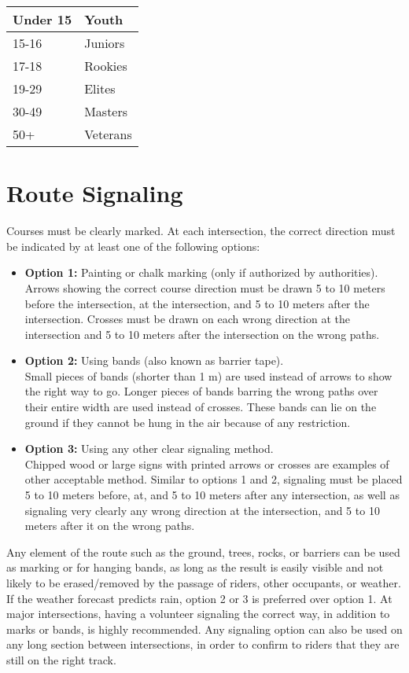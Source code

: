 \begin{tabular}{|l|l|}
\hline
Under 15 & Youth \\
\hline
15-16 & Juniors \\
\hline
17-18 & Rookies \\
\hline
19-29 & Elites \\
\hline
30-49 & Masters \\
\hline
50+ & Veterans \\
\hline
\end{tabular}

\section{Route Signaling}
Courses must be clearly marked.
At each intersection, the correct direction must be indicated by at least one of the following options:
\begin{itemize}
\item \textbf{Option 1:} Painting or chalk marking (only if authorized by authorities).\\
Arrows showing the correct course direction must be drawn 5 to 10 meters before the intersection, at the intersection, and 5 to 10 meters after the intersection.
Crosses must be drawn on each wrong direction at the intersection and 5 to 10 meters after the intersection on the wrong paths.
\item \textbf{Option 2:} Using bands (also known as barrier tape).\\
Small pieces of bands (shorter than 1 m) are used instead of arrows to show the right way to go.
Longer pieces of bands barring the wrong paths over their entire width are used instead of crosses.
These bands can lie on the ground if they cannot be hung in the air because of any restriction.
\item \textbf{Option 3:} Using any other clear signaling method.\\
Chipped wood or large signs with printed arrows or crosses are examples of other acceptable method.
Similar to options 1 and 2, signaling must be placed 5 to 10 meters before, at, and 5 to 10 meters after any intersection, as well as signaling very clearly any wrong direction at the intersection, and 5 to 10 meters after it on the wrong paths.
\end{itemize}
Any element of the route such as the ground, trees, rocks, or barriers can be used as marking or for hanging bands, as long as the result is easily visible and not likely to be erased/removed by the passage of riders, other occupants, or weather.
If the weather forecast predicts rain, option 2 or 3 is preferred over option 1.
At major intersections, having a volunteer signaling the correct way, in addition to marks or bands, is highly recommended.
Any signaling option can also be used on any long section between intersections, in order to confirm to riders that they are still on the right track.

